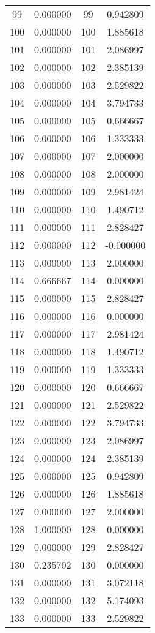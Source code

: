 \documentclass[12pt]{article}
\begin{document}
\begin{longtable}{@{}cccc@{}}
99 & 0.000000 & 99 & 0.942809 \\
100 & 0.000000 & 100 & 1.885618 \\
101 & 0.000000 & 101 & 2.086997 \\
102 & 0.000000 & 102 & 2.385139 \\
103 & 0.000000 & 103 & 2.529822 \\
104 & 0.000000 & 104 & 3.794733 \\
105 & 0.000000 & 105 & 0.666667 \\
106 & 0.000000 & 106 & 1.333333 \\
107 & 0.000000 & 107 & 2.000000 \\
108 & 0.000000 & 108 & 2.000000 \\
109 & 0.000000 & 109 & 2.981424 \\
110 & 0.000000 & 110 & 1.490712 \\
111 & 0.000000 & 111 & 2.828427 \\
112 & 0.000000 & 112 & -0.000000 \\
113 & 0.000000 & 113 & 2.000000 \\
114 & 0.666667 & 114 & 0.000000 \\
115 & 0.000000 & 115 & 2.828427 \\
116 & 0.000000 & 116 & 0.000000 \\
117 & 0.000000 & 117 & 2.981424 \\
118 & 0.000000 & 118 & 1.490712 \\
119 & 0.000000 & 119 & 1.333333 \\
120 & 0.000000 & 120 & 0.666667 \\
121 & 0.000000 & 121 & 2.529822 \\
122 & 0.000000 & 122 & 3.794733 \\
123 & 0.000000 & 123 & 2.086997 \\
124 & 0.000000 & 124 & 2.385139 \\
125 & 0.000000 & 125 & 0.942809 \\
126 & 0.000000 & 126 & 1.885618 \\
127 & 0.000000 & 127 & 2.000000 \\
128 & 1.000000 & 128 & 0.000000 \\
129 & 0.000000 & 129 & 2.828427 \\
130 & 0.235702 & 130 & 0.000000 \\
131 & 0.000000 & 131 & 3.072118 \\
132 & 0.000000 & 132 & 5.174093 \\
133 & 0.000000 & 133 & 2.529822 \\

\end{longtable}
\end{document}
